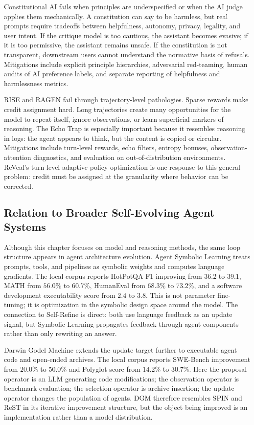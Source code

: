 Constitutional AI fails when principles are underspecified or when the AI judge applies them mechanically. A constitution can say to be harmless, but real prompts require tradeoffs between helpfulness, autonomy, privacy, legality, and user intent. If the critique model is too cautious, the assistant becomes evasive; if it is too permissive, the assistant remains unsafe. If the constitution is not transparent, downstream users cannot understand the normative basis of refusals. Mitigations include explicit principle hierarchies, adversarial red-teaming, human audits of AI preference labels, and separate reporting of helpfulness and harmlessness metrics.

RISE and RAGEN fail through trajectory-level pathologies. Sparse rewards make credit assignment hard. Long trajectories create many opportunities for the model to repeat itself, ignore observations, or learn superficial markers of reasoning. The Echo Trap is especially important because it resembles reasoning in logs: the agent appears to think, but the content is copied or circular. Mitigations include turn-level rewards, echo filters, entropy bonuses, observation-attention diagnostics, and evaluation on out-of-distribution environments. ReVeal's turn-level adaptive policy optimization is one response to this general problem: credit must be assigned at the granularity where behavior can be corrected.

\subsection{Relation to Broader Self-Evolving Agent Systems}
\label{subsec:relation-broader-systems}

Although this chapter focuses on model and reasoning methods, the same loop structure appears in agent architecture evolution. Agent Symbolic Learning \cite{zhou2024agent} treats prompts, tools, and pipelines as symbolic weights and computes language gradients. The local corpus reports HotPotQA \cite{hotpotqa2018} F1 improving from $36.2$ to $39.1$, MATH \cite{math2021} from $56.0\%$ to $60.7\%$, HumanEval from $68.3\%$ to $73.2\%$, and a software development executability score from $2.4$ to $3.8$. This is not parameter fine-tuning; it is optimization in the symbolic design space around the model. The connection to Self-Refine is direct: both use language feedback as an update signal, but Symbolic Learning propagates feedback through agent components rather than only rewriting an answer.

Darwin Godel Machine \cite{zhang2025darwin} extends the update target further to executable agent code and open-ended archives. The local corpus reports SWE-Bench improvement from $20.0\%$ to $50.0\%$ and Polyglot score from $14.2\%$ to $30.7\%$. Here the proposal operator is an LLM generating code modifications; the observation operator is benchmark evaluation; the selection operator is archive insertion; the update operator changes the population of agents. DGM therefore resembles SPIN and ReST in its iterative improvement structure, but the object being improved is an implementation rather than a model distribution.

